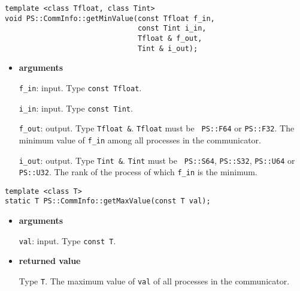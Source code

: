 \begin{screen}
\begin{verbatim}
template <class Tfloat, class Tint>
void PS::CommInfo::getMinValue(const Tfloat f_in,
                               const Tint i_in,
                               Tfloat & f_out,
                               Tint & i_out);
\end{verbatim}
\end{screen}

\begin{itemize}

\item{\bf arguments}

{\tt f\_in}: input. Type {\tt const Tfloat}.

{\tt i\_in}: input. Type {\tt const Tint}.

{\tt f\_out}: output. Type {\tt Tfloat \&}. {\tt Tfloat} must be {\tt
PS::F64} or {\tt PS::F32}. The minimum value of {\tt f\_in} among all
processes in the communicator.

{\tt i\_out}: output. Type {\tt Tint \&}. {\tt Tint} must be {\tt
PS::S64}, {\tt PS::S32}, {\tt PS::U64} or {\tt PS::U32}. The rank of
the process of which {\tt f\_in} is the minimum.









\end{itemize}


\begin{screen}
\begin{verbatim}
template <class T>
static T PS::CommInfo::getMaxValue(const T val);
\end{verbatim}
\end{screen}

\begin{itemize}

\item{\bf arguments}

{\tt val}: input. Type {\tt const T}.

\item{\bf returned value}

Type {\tt T}. The maximum value of {\tt val} of all processes in the communicator.





\end{itemize}

